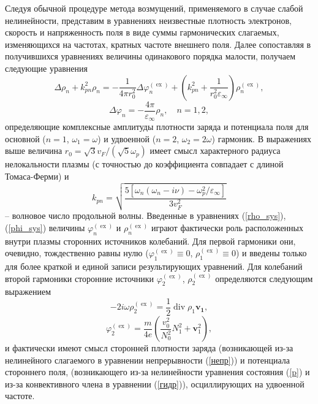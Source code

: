 \documentclass[12pt, a4paper]{article}
\renewcommand{\vec}{\mathbf}
\def \eps {\varepsilon}
\def \w {\omega}
\def \ph {\varphi}
\def \ex { \operatorname{ex}}
\begin{document}
Следуя обычной процедуре метода возмущений, применяемого в случае слабой нелинейности, представим в уравнениях неизвестные плотность электронов, скорость и напряженность поля в виде суммы гармонических слагаемых, изменяющихся на частотах, кратных частоте внешнего поля. Далее сопоставляя в получившихся уравнениях величины одинакового порядка малости, получаем следующие уравнения
\begin{equation} 
	\label{rho_sys}
 \Delta \rho_{n} + k_{pn}^2\rho_{n} = -\frac{1}{4 \pi r_0^2} \Delta \ph^{(\ex)}_{n} + \left( k_{pn}^2 + \frac{1}{r_0^2\eps_\infty}\right) {\rho^{(\ex)}_{n},}
\end{equation}
\begin{equation} 
	\label{phi_sys}
 \Delta \ph_{n} = - \frac{4 \pi}{\eps_\infty} \rho_{n}, \quad n = 1,2,
\end{equation}
определяющие комплексные амплитуды плотности заряда и потенциала поля для основной ($n=1$, $\w_1=\w$) и удвоенной ($n=2$, $\w_2=2\w$) гармоник.
В выражениях выше величина $r_0 = \sqrt{3}v_F/(\sqrt{5}\w_p)$ имеет смысл характерного радиуса нелокальности плазмы (с точностью до коэффициента совпадает с длиной Томаса-Ферми) и  
\begin{equation} 
k_{pn} = \sqrt{\frac{5[\w_{n}(\w_{n} - i\nu) - \w_p^2/\eps_\infty]}{3v_F^2}} 
\end{equation}
-- волновое число продольной волны.
Введенные в уравнениях (\ref{rho_sys}), (\ref{phi_sys}) величины $\ph^{(\ex)}_{n}$ и $\rho^{(\ex)}_{n}$ играют фактически роль расположенных внутри плазмы сторонних источников колебаний. Для первой гармоники они, очевидно, тождественно равны нулю ($\ph^{(\ex)}_1\equiv0$, $\rho^{(\ex)}_1\equiv0$) и введены только для более краткой и единой записи результирующих уравнений. Для колебаний второй гармоники сторонние источники $\ph^{(\ex)}_2$, $\rho^{(\ex)}_2$ определяются следующим выражением 
\begin{equation}
	\label{rho_ex}
 - 2i\w \rho^{(\ex)}_2 = \frac{1}{2}\operatorname{div} \rho_1 \vec{v_1},
\end{equation}
\begin{equation}
	\label{phi_ex}
\ph^{(\ex)}_2 = \frac{m}{4e}\left(\frac{v_0^2}{N_0^2}N_1^2 + \vec{v}_1^2\right),
\end{equation}
и фактически имеют смысл сторонней плотности заряда (возникающей из-за нелинейного слагаемого в уравнении непрерывности (\ref{непр})) и потенциала стороннего поля, (возникающего из-за нелинейности уравнения состояния (\ref{p}) и из-за конвективного члена в уравнении (\ref{гидр})), осциллирующих на удвоенной частоте. 
\end{document}
